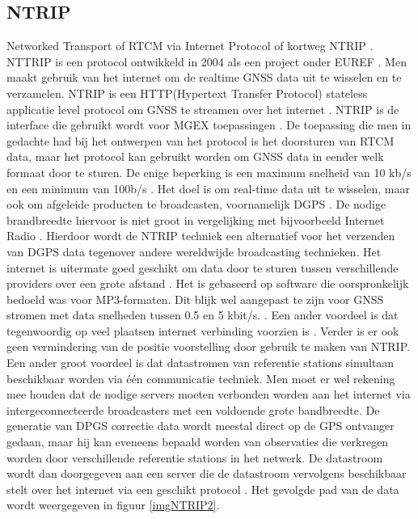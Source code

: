 \subsection{NTRIP}
\label{LNTR}
Networked Transport of RTCM via Internet Protocol of kortweg NTRIP \cite{LBibNTRIP,LBibNTRIP3}. NTTRIP is een protocol ontwikkeld in 2004 \cite{LBibNTRIP3} als een project onder EUREF \cite{LBibNTRIP4}. Men maakt gebruik van het internet om de realtime GNSS data uit te wisselen en te verzamelen. NTRIP is een HTTP(Hypertext Transfer Protocol) stateless applicatie level protocol om GNSS te streamen over het internet \cite{LBibNTRIP}. NTRIP is de interface die gebruikt wordt voor MGEX toepassingen \cite{LBibGNSS9}. De toepassing die men in gedachte had bij het ontwerpen van het protocol is het doorsturen van RTCM data, maar het protocol kan gebruikt worden om GNSS data in eender welk formaat door te sturen. De enige beperking is een maximum snelheid van 10 kb/s en een minimum van 100b/s \cite{LBibNTRIP3}.  Het doel is om real-time data uit te wisselen, maar ook om afgeleide producten te broadcasten, voornamelijk DGPS \cite{LBibNTRIP2}. De nodige brandbreedte hiervoor is niet groot in vergelijking met bijvoorbeeld Internet Radio \cite{LBibNTRIP}. Hierdoor wordt de NTRIP techniek een alternatief voor het verzenden van DGPS data tegenover andere  wereldwijde broadcasting technieken. Het internet is uitermate goed geschikt om data door te sturen tussen verschillende providers over een grote afstand \cite{LBibNTRIP2}. Het is gebaseerd op software die oorspronkelijk bedoeld was voor MP3-formaten. Dit blijk wel aangepast te zijn voor GNSS stromen met data snelheden tussen 0.5 en 5 kbit/s. \cite{LBibGPS}. Een ander voordeel is dat tegenwoordig op veel plaatsen internet verbinding voorzien is \cite{LBibNTRIP}. Verder is er ook geen vermindering van de positie voorstelling door gebruik te maken van NTRIP. Een ander groot voordeel is dat datastromen van referentie stations simultaan beschikbaar worden via \'e\'en communicatie techniek. Men moet er wel rekening mee houden dat de nodige servers moeten verbonden worden aan het internet via intergeconnecteerde broadcasters met een voldoende grote bandbreedte.  De generatie van DPGS correctie data wordt meestal direct op de GPS ontvanger gedaan, maar hij kan eveneens bepaald worden van observaties die verkregen worden door verschillende referentie stations in het netwerk. De datastroom wordt dan doorgegeven aan een server die de datastroom vervolgens beschikbaar stelt over het internet via een geschikt protocol \cite{LBibNTRIP2}. Het gevolgde pad van de data wordt weergegeven in figuur \ref{imgNTRIP2}.

